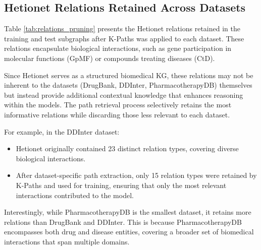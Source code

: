 \subsection{Hetionet Relations Retained Across Datasets}\label{app:hetio}
Table \ref{tab:relations_pruning} presents the Hetionet relations retained in the training and test subgraphs after K-Paths was applied to each dataset. These relations encapsulate biological interactions, such as gene participation in molecular functions (GpMF) or compounds treating diseases (CtD).

Since Hetionet serves as a structured biomedical KG, these relations may not be inherent to the datasets (DrugBank, DDInter, PharmacotherapyDB) themselves 
but instead provide additional contextual knowledge that enhances reasoning within the models. The path retrieval process selectively retains the most informative relations while discarding those less relevant to each dataset.



For example, in the DDInter dataset: 
\begin{itemize} 
    \item Hetionet originally contained 23 distinct relation types, covering diverse biological interactions. 
    \item After dataset-specific path extraction, only 15 relation types were retained by K-Paths and used for training, ensuring that only the most relevant interactions contributed to the model. 
\end{itemize}

Interestingly, while PharmacotherapyDB is the smallest dataset, it retains more relations than DrugBank and DDInter. This is because PharmacotherapyDB encompasses both drug and disease entities, covering a broader set of biomedical interactions that span multiple domains. 

